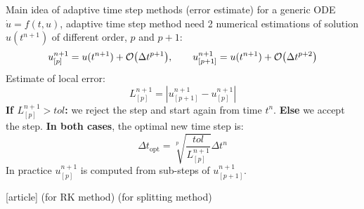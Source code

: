 \documentclass{beamer}
\newcommand{\mbold}[1]{{\textbf{\color{PLB}#1}}}
\newcommand{\customcite}[1]{\cite{#1}}
\begin{document}
\begin{frame}{Main idea of adaptive time step methods (error estimate)}
  for a generic ODE $\dot{u} = f(t,u)$, adaptive time step method need 2 numerical estimations of solution $u(t^{n+1})$ of different order, $p$ and $p+1$:
  $$
    u^{n+1}_{[p]} = u(t^{n+1}) + \order{\Delta t^{p+1}},\qquad u^{n+1}_{[p+1]} = u(t^{n+1}) + \order{\Delta t^{p+2}}
  $$
  Estimate of local error:
  \vspace{-0.5cm}
  $$
    L_{[p]}^{n+1} = \left| u^{n+1}_{[p+1]} - u^{n+1}_{[p]} \right|
  $$
  \mbold{If $L^{n+1}_{[p]}>tol$:} we reject the step and start again from time $t^n$. \mbold{Else} we accept the step. \mbold{In both cases}, the optimal new time step is:
  $$
    \Delta t_\text{opt} = \sqrt[p]{\frac{tol}{L^{n+1}_{[p]}}}\Delta t^n
  $$
  In practice $u^{n+1}_{[p]}$ is computed from sub-steps of $u^{n+1}_{[p+1]}$.

  \begin{thebibliography}{9}
    [article]
     \customcite{Dormand:1978} \textcolor{defaultcolor}{(for RK method)}
     \customcite{Blanes:2019} \textcolor{defaultcolor}{(for splitting method)}
  \end{thebibliography}
\end{frame}

\end{document}
